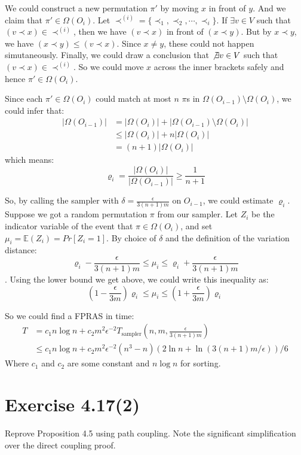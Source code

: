 \documentclass{article}
\begin{document}
We could construct a new permutation $\pi'$ by moving $x$ in front of $y$. And we claim that $\pi'\in \Omega(O_i)$. Let $\prec^{(i)} = \{\prec_1, \prec_2, \cdots, \prec_i\}$. If $\exists v\in V$ such that $(v\prec x)\in\prec^{(i)}$, then we have $(v\prec x)$ in front of $(x\prec y)$. But by $x\prec y$, we have $(x\prec y)\leq (v\prec x)$. Since $x\not=y$, these could not happen simutaneously. Finally, we could draw a conclusion that $\not\exists v\in V$ such that $(v\prec x)\in \prec^{(i)}$. So we could move $x$ across the inner brackets safely and hence $\pi'\in\Omega(O_i)$.

Since each $\pi'\in\Omega(O_i)$ could match at most $n$ $\pi$s in $\Omega(O_{i-1})\setminus\Omega(O_i)$, we could infer that:
\begin{align*}
  |\Omega(O_{i-1})| &= |\Omega(O_i)| + |\Omega(O_{i-1})\setminus\Omega(O_i)| \\
   &\leq |\Omega(O_i)| + n|\Omega(O_i)| \\
   &= (n+1)|\Omega(O_i)| 
\end{align*}
which means:
\[
  \varrho_i = \frac{|\Omega(O_i)|}{|\Omega(O_{i-1})|} \geq \frac{1}{n+1}
\]

So, by calling the sampler with $\delta = \frac{\epsilon}{3(n+1)m}$ on $O_{i-1}$, we could estimate $\varrho_i$. Suppose we got a random permutation $\pi$ from our sampler. Let $Z_i$ be the indicator variable of the event that $\pi\in \Omega(O_i)$, and set $\mu_i = \mathbb{E}(Z_i) = Pr[Z_i = 1]$. By choice of $\delta$ and the definition of the variation distance:
\[
  \varrho_i - \frac{\epsilon}{3(n+1)m} \leq \mu_i \leq \varrho_i + \frac{\epsilon}{3(n+1)m}
\]. Using the lower bound we get above, we could write this inequality as:
\[
  (1 - \frac{\epsilon}{3m})\varrho_i \leq \mu_i \leq (1 + \frac{\epsilon}{3m})\varrho_i
\]

So we could find a FPRAS in time:
\begin{align*}
  T &= c_1n\log n + c_2m^2\epsilon^{-2}T_{\mbox{sampler}}(n, m, \frac{\epsilon}{3(n+1)m}) \\
  &\leq c_1n\log n + c_2m^2\epsilon^{-2}(n^3-n)(2\ln{n} + \ln{(3(n+1)m/\epsilon)})/6
\end{align*}
Where $c_1$ and $c_2$ are some constant and $n\log n$ for sorting.

\section{Exercise 4.17(2)}
Reprove Proposition 4.5 using path coupling. Note the significant simplification over the direct coupling proof.
\end{document}
